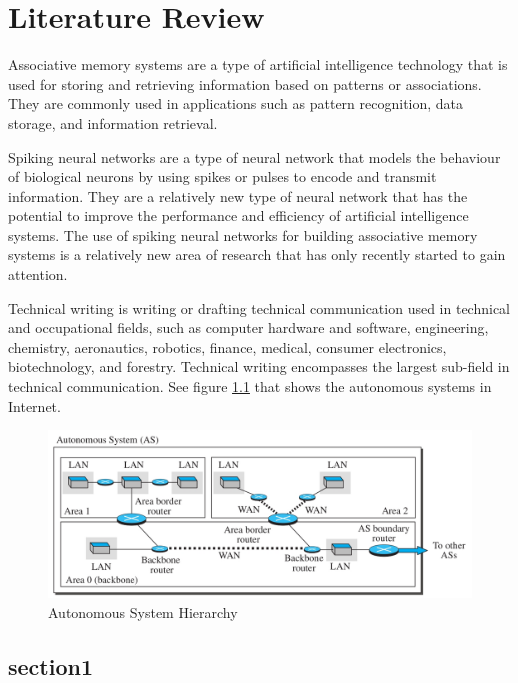 \chapter{Literature Review}

Associative memory systems are a type of artificial intelligence technology
that is used for storing and retrieving information based on patterns or
associations. They are commonly used in applications such as pattern
recognition, data storage, and information retrieval.

Spiking neural networks are a type of neural network that models the behaviour
of biological neurons by using spikes or pulses to encode and transmit
information. They are a relatively new type of neural network that has the
potential to improve the performance and efficiency of artificial intelligence
systems.
The use of spiking neural networks for building associative memory systems is a relatively new area of research that has only recently started to gain
attention. 

Technical\cite{base} writing is writing or drafting technical communication used in
technical and occupational fields\cite{india}, such as computer hardware and
software\cite{rpi}, engineering, chemistry, aeronautics, robotics,
finance\cite{japan}, medical, consumer electronics, biotechnology, and
forestry. Technical writing encompasses the largest sub-field in technical
communication. See figure \ref{net2} that shows the autonomous systems in
Internet.

\begin{figure}[h!]
	\centering
	\includegraphics[width=0.9\linewidth]{ospf}
	\caption{Autonomous System Hierarchy}
	\label{net2}
\end{figure}

\section{section1}
\lipsum[2] %

